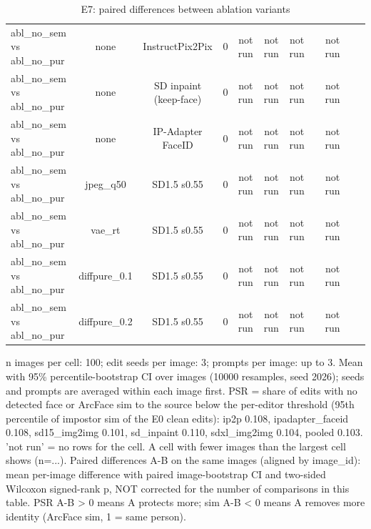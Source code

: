 \begin{table}[t]
{\begin{tabular}{lcccccccccc}
abl\_no\_sem vs abl\_no\_pur & none & InstructPix2Pix & 0 & not run & not run & not run &  & not run &  &  \\
abl\_no\_sem vs abl\_no\_pur & none & SD inpaint (keep-face) & 0 & not run & not run & not run &  & not run &  &  \\
abl\_no\_sem vs abl\_no\_pur & none & IP-Adapter FaceID & 0 & not run & not run & not run &  & not run &  &  \\
abl\_no\_sem vs abl\_no\_pur & jpeg\_q50 & SD1.5 s0.55 & 0 & not run & not run & not run &  & not run &  &  \\
abl\_no\_sem vs abl\_no\_pur & vae\_rt & SD1.5 s0.55 & 0 & not run & not run & not run &  & not run &  &  \\
abl\_no\_sem vs abl\_no\_pur & diffpure\_0.1 & SD1.5 s0.55 & 0 & not run & not run & not run &  & not run &  &  \\
abl\_no\_sem vs abl\_no\_pur & diffpure\_0.2 & SD1.5 s0.55 & 0 & not run & not run & not run &  & not run &  &  \\
\bottomrule
\end{tabular}
}
\caption{E7: paired differences between ablation variants}
\label{tab:e7_paired}
\par\footnotesize n images per cell: 100; edit seeds per image: 3; prompts per image: up to 3. Mean with 95\% percentile-bootstrap CI over images (10000 resamples, seed 2026); seeds and prompts are averaged within each image first. PSR = share of edits with no detected face or ArcFace sim to the source below the per-editor threshold (95th percentile of impostor sim of the E0 clean edits): ip2p 0.108, ipadapter\_faceid 0.108, sd15\_img2img 0.101, sd\_inpaint 0.110, sdxl\_img2img 0.104, pooled 0.103. 'not run' = no rows for the cell. A cell with fewer images than the largest cell shows (n=...). Paired differences A-B on the same images (aligned by image\_id): mean per-image difference with paired image-bootstrap CI and two-sided Wilcoxon signed-rank p, NOT corrected for the number of comparisons in this table. PSR A-B > 0 means A protects more; sim A-B < 0 means A removes more identity (ArcFace sim, 1 = same person).
\end{table}
